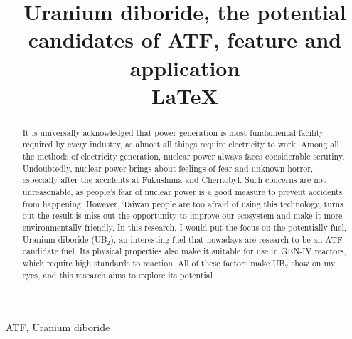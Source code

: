 \documentclass[final,12pt,times,twocolumn]{elsarticle}
\begin{document}
\begin{frontmatter}
\title{Uranium diboride, the potential candidates of ATF, feature and application \\ \LaTeX}
\begin{abstract}
It is universally acknowledged that power generation is most fundamental facility required by every industry, as almost all things require electricity to work. Among all the methods of electricity generation, nuclear power always faces considerable scrutiny. Undoubtedly, nuclear power brings about feelings of fear and unknown horror, especially after the accidents at Fukushima and Chernobyl. Such concerns are not unreasonable, as people's fear of nuclear power is a good measure to prevent accidents from happening. However, Taiwan people are too afraid of using this technology, turns out the result is miss out the opportunity to improve our ecosystem and make it more environmentally friendly. In this research, I would put the focus on the potentially fuel, Uranium diboride (UB$_{2}$), an interesting fuel that nowadays are research to be an ATF candidate fuel. Its physical properties also make it suitable for use in GEN-IV reactors, which require high standards to reaction. All of these factors make UB$_{2}$ show on my eyes, and this research aims to explore its potential.
\end{abstract}

\begin{keyword}
ATF, Uranium diboride
\end{keyword}

\end{frontmatter}
\end{document}
